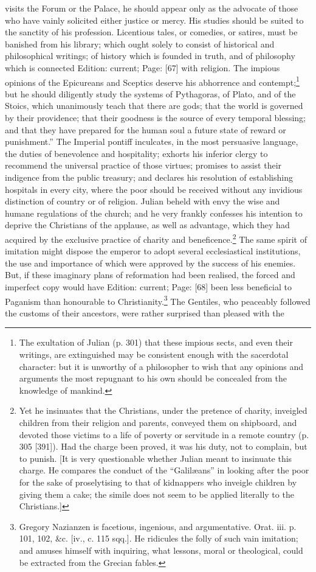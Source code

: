 visits the Forum or the Palace, he should appear only as the advocate of those who have vainly solicited either justice or mercy. His studies should be suited to the sanctity of his profession. Licentious tales, or comedies, or satires, must be banished from his library; which ought solely to consist of historical and philosophical writings; of history which is founded in truth, and of philosophy which is connected Edition: current; Page: [67] with religion. The impious opinions of the Epicureans and Sceptics deserve his abhorrence and contempt;\footnote{The exultation of Julian (p. 301) that these impious sects, and even their writings, are extinguished may be consistent enough with the sacerdotal character: but it is unworthy of a philosopher to wish that any opinions and arguments the most repugnant to his own should be concealed from the knowledge of mankind.} but he should diligently study the systems of Pythagoras, of Plato, and of the Stoics, which unanimously teach that there are gods; that the world is governed by their providence; that their goodness is the source of every temporal blessing; and that they have prepared for the human soul a future state of reward or punishment.\texthebrew{}” The Imperial pontiff inculcates, in the most persuasive language, the duties of benevolence and hospitality; exhorts his inferior clergy to recommend the universal practice of those virtues; promises to assist their indigence from the public treasury; and declares his resolution of establishing hospitals in every city, where the poor should be received without any invidious distinction of country or of religion. Julian beheld with envy the wise and humane regulations of the church; and he very frankly confesses his intention to deprive the Christians of the applause, as well as advantage, which they had acquired by the exclusive practice of charity and beneficence.\footnote{Yet he insinuates that the Christians, under the pretence of charity, inveigled children from their religion and parents, conveyed them on shipboard, and devoted those victims to a life of poverty or servitude in a remote country (p. 305 [391]). Had the charge been proved, it was his duty, not to complain, but to punish. [It is very questionable whether Julian meant to insinuate this charge. He compares the conduct of the \texthebrew{“}Galilæans\texthebrew{}” in looking after the poor for the sake of proselytising to that of kidnappers who inveigle children by giving them a cake; the simile does not seem to be applied literally to the Christians.]} The same spirit of imitation might dispose the emperor to adopt several ecclesiastical institutions, the use and importance of which were approved by the success of his enemies. But, if these imaginary plans of reformation had been realised, the forced and imperfect copy would have Edition: current; Page: [68] been less beneficial to Paganism than honourable to Christianity.\footnote{Gregory Nazianzen is facetious, ingenious, and argumentative. Orat. iii. p. 101, 102, \&c. [iv., c. 115 sqq.]. He ridicules the folly of such vain imitation; and amuses himself with inquiring, what lessons, moral or theological, could be extracted from the Grecian fables.} The Gentiles, who peaceably followed the customs of their ancestors, were rather surprised than pleased with the 